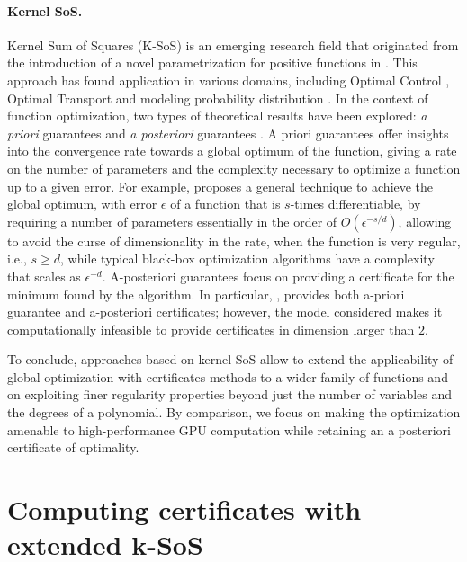 \documentclass{article}
\begin{document}
\paragraph{Kernel SoS.}
Kernel Sum of Squares (K-SoS) is an emerging research field that originated from the introduction of a novel parametrization for positive functions in \cite{marteau-fereyNonparametricModelsNonnegative2020}. This approach has found application in various domains, including Optimal Control \cite{berthierInfiniteDimensionalSumsofSquaresOptimal2022}, Optimal Transport \cite{muzellecNearoptimalEstimationSmooth2021} and modeling probability distribution \cite{rudiPSDRepresentationsEffective2021}. In the context of function optimization, two types of theoretical results have been explored: \emph{a priori} guarantees \cite{rudiFindingGlobalMinima2020} and \emph{a posteriori} guarantees \cite{woodworthNonConvexOptimizationCertificates2022}. A priori guarantees offer insights into the convergence rate towards a global optimum of the function, giving a rate on the number of parameters and the complexity necessary to optimize a function up to a given error. For example, \cite{rudiFindingGlobalMinima2020} proposes a general technique to achieve the global optimum, with error $\epsilon$ of a function that is $s$-times differentiable, by requiring a number of parameters essentially in the order of $O(\epsilon^{-s/d})$, allowing to avoid the curse of dimensionality in the rate, when the function is very regular, i.e., $s \geq d$, while typical black-box optimization algorithms have a complexity that scales as $\epsilon^{-d}$. A-posteriori guarantees focus on providing a certificate for the minimum found by the algorithm. In particular, \cite{woodworthNonConvexOptimizationCertificates2022}, provides both a-priori guarantee and a-posteriori certificates; however, the model considered makes it computationally infeasible to provide certificates in dimension larger than $2$.

To conclude, approaches based on kernel-SoS allow to extend the applicability of global optimization with certificates methods to a wider family of functions and on exploiting finer regularity properties beyond just the number of variables and the degrees of a polynomial. By comparison,
we focus on making the optimization amenable to high-performance GPU computation while retaining an a posteriori certificate of optimality.

\section{Computing certificates with extended k-SoS}
\end{document}
